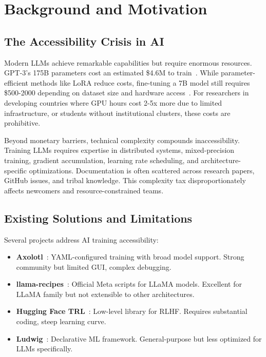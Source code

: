 \section{Background and Motivation}


\subsection{The Accessibility Crisis in AI}

Modern LLMs achieve remarkable capabilities but require enormous resources. GPT-3's 175B parameters cost an estimated \$4.6M to train~\citep{brown2020gpt3}. While parameter-efficient methods like LoRA reduce costs, fine-tuning a 7B model still requires \$500-2000 depending on dataset size and hardware access~\citep{hu2021lora}. For researchers in developing countries where GPU hours cost 2-5x more due to limited infrastructure, or students without institutional clusters, these costs are prohibitive.

Beyond monetary barriers, technical complexity compounds inaccessibility. Training LLMs requires expertise in distributed systems, mixed-precision training, gradient accumulation, learning rate scheduling, and architecture-specific optimizations. Documentation is often scattered across research papers, GitHub issues, and tribal knowledge. This complexity tax disproportionately affects newcomers and resource-constrained teams.

\subsection{Existing Solutions and Limitations}

Several projects address AI training accessibility:

\begin{itemize}
\item \textbf{Axolotl}~\citep{axolotl2024}: YAML-configured training with broad model support. Strong community but limited GUI, complex debugging.
\item \textbf{llama-recipes}~\citep{meta2024llamarecipes}: Official Meta scripts for LLaMA models. Excellent for LLaMA family but not extensible to other architectures.
\item \textbf{Hugging Face TRL}~\citep{vonwerra2022trl}: Low-level library for RLHF. Requires substantial coding, steep learning curve.
\item \textbf{Ludwig}~\citep{molino2019ludwig}: Declarative ML framework. General-purpose but less optimized for LLMs specifically.
\end{itemize}

